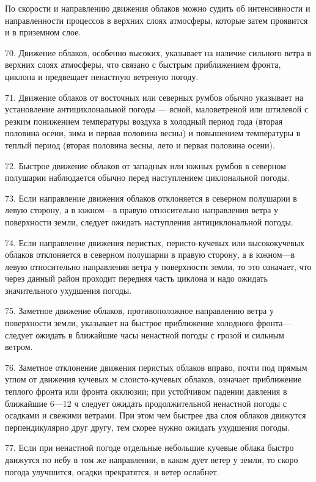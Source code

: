 По скорости и направлению движения облаков можно судить об интенсивности и направленности процессов в верхних слоях атмосферы, которые затем проявится и в приземном слое.

70. Движение облаков, особенно высоких, указывает на наличие сильного ветра в верхних слоях атмосферы, что связано с быстрым приближением фронта, циклона и предвещает ненастную ветреную погоду.

71. Движение облаков от восточных или северных румбов обычно указывает на установление антициклональной погоды — ясной, маловетреной или штилевой с резким понижением температуры воздуха в холодный период года (вторая половина осени, зима и первая половина весны) и повышением температуры в теплый период (вторая половина весны, лето и первая половина осени).

72. Быстрое движение облаков от западных или южных румбов в северном полушарии наблюдается обычно перед наступлением циклональной погоды.

73. Если направление движения облаков отклоняется в северном полушарии в левую сторону, а в южном—в правую относительно направления ветра у поверхности земли, следует ожидать наступления антициклональной погоды.

74. Если направление движения перистых, перисто-кучевых или высококучевых облаков отклоняется в северном полушарии в правую сторону, а в южном—в левую относительно направления ветра у поверхности земли, то это означает, что через данный район проходит передняя часть циклона и надо ожидать значительного ухудшения погоды.

75. Заметное движение облаков, противоположное направлению ветра у поверхности земли, указывает на быстрое приближение холодного фронта—следует ожидать в ближайшие часы ненастной погоды с грозой и сильным ветром.

76. Заметное отклонение движения перистых облаков вправо, почти под прямым углом от движения кучевых м слоисто-кучевых облаков, означает приближение теплого фронта или фронта окклюзии; при устойчивом падении давления в ближайшие 6—12 ч следует ожидать продолжительной ненастной погоды с осадками и свежими ветрами. При этом чем быстрее два слоя облаков движутся перпендикулярно друг другу, тем скорее нужно ожидать ухудшения погоды.

77. Если при ненастной погоде отдельные небольшие кучевые облака быстро движутся по небу в том же направлении, в каком дует ветер у земли, то скоро погода улучшится, осадки прекратятся, и ветер ослабнет.

